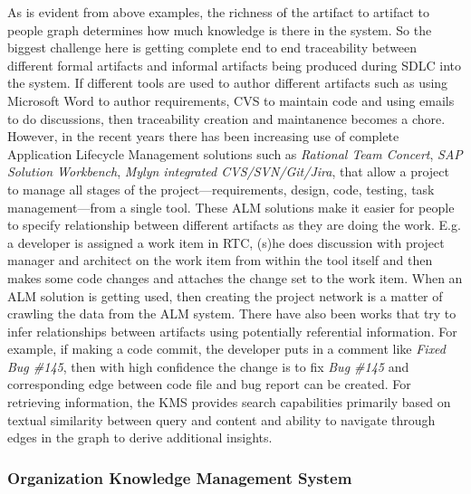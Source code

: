 As is evident from above examples, the richness of the artifact to artifact to people graph determines how much knowledge is there in the system. So the biggest challenge here is getting complete end to end traceability between different formal artifacts and informal artifacts being produced during SDLC into the system. If different tools are used to author different artifacts such as using Microsoft Word to author requirements, CVS to maintain code and using emails to do discussions, then traceability creation and maintanence becomes a chore. However, in the recent years there has been increasing use of complete Application Lifecycle Management solutions such as \textit{Rational Team Concert}, \textit{SAP Solution Workbench}, \textit{Mylyn integrated CVS/SVN/Git/Jira}, that allow a project to manage all stages of the project---requirements, design, code, testing, task management---from a single tool. These ALM solutions make it easier for people to specify relationship between different artifacts as they are doing the work. E.g. a developer is assigned a work item in RTC, (s)he does discussion with project manager and architect on the work item from within the tool itself and then makes some code changes and attaches the change set to the work item.  When an ALM solution is getting used, then creating the project network is a matter of crawling the data from the ALM system. There have also been works that try to infer relationships between artifacts using potentially referential information\cite{}. For example, if making a code commit, the developer puts in a comment like \textit{Fixed Bug \#145}, then with high confidence the change is to fix \textit{Bug \#145} and corresponding edge between code file and bug report can be created. For retrieving information, the KMS provides search capabilities primarily based on textual similarity between query and content and ability to navigate through edges in the graph to derive additional insights. 

\subsubsection{Organization Knowledge Management System}

